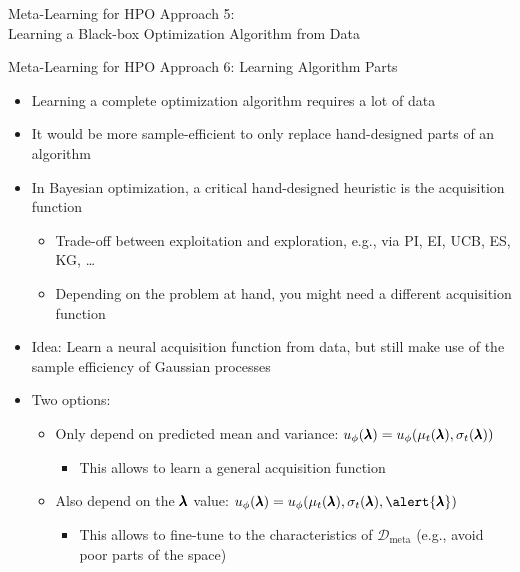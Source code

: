 \begin{frame}[c]{Meta-Learning for HPO Approach 5:\\ Learning a Black-box Optimization Algorithm from Data}
\begin{itemize}
\begin{itemize}

    \end{itemize}
\end{itemize}

\end{frame}
\begin{frame}[c]{Meta-Learning for HPO Approach 6: Learning Algorithm Parts}

\begin{itemize}
	\item Learning a complete optimization algorithm  \alert{requires a lot of data}
	\item It would be more \alert{sample-efficient} to \alert{only replace hand-designed parts} of an algorithm

\bigskip
\pause
	\item In Bayesian optimization, a critical hand-designed heuristic is the acquisition function
	\begin{itemize}
		\item Trade-off between exploitation and exploration, e.g., via PI, EI, UCB, ES, KG, \dots 
		\item Depending on the problem at hand, you might need a different acquisition function
	\end{itemize}
\pause
\smallskip

    \item \alert{Idea:} Learn a \alert{neural acquisition function} from data, but still make use of the sample efficiency of Gaussian processes 

\pause
\medskip
    \item Two options:
    \begin{itemize}
        \item Only depend on predicted mean and variance: $u_\phi(\pmb{\lambda}) = u_\phi(\mu_t(\pmb{\lambda}), \sigma_t(\pmb{\lambda}))$ 
        \begin{itemize}
            \item This allows to learn a general acquisition function
        \end{itemize}
\pause
        \item Also depend on the $\pmb{\lambda}$ value: $\acq_\phi(\conf) = \acq_\phi(\mu_t(\conf), \sigma_t(\conf), \alert{\conf})$  
        \begin{itemize}
            \item This allows to fine-tune to the characteristics of $\mathcal{D}_{\text{meta}}$ (e.g., avoid poor parts of the space) 
        \end{itemize}
    \end{itemize}


\end{itemize}
\end{frame}
